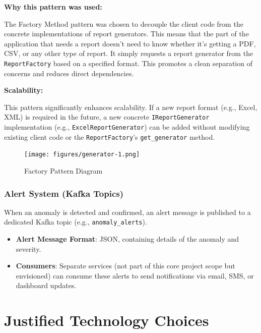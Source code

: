 \textbf{Why this pattern was used:}

The Factory Method pattern was chosen to decouple the client code from the concrete implementations of report generators. This means that the part of the application that needs a report doesn't need to know whether it's getting a PDF, CSV, or any other type of report. It simply requests a report generator from the \texttt{ReportFactory} based on a specified format. This promotes a clean separation of concerns and reduces direct dependencies.

\textbf{Scalability:}

This pattern significantly enhances scalability. If a new report format (e.g., Excel, XML) is required in the future, a new concrete \texttt{IReportGenerator} implementation (e.g., \texttt{ExcelReportGenerator}) can be added without modifying existing client code or the \texttt{ReportFactory}'s \texttt{get\_generator} method.

\begin{figure}[H]
    \centering
    \texttt{[image: figures/generator-1.png]}
    \caption{Factory Pattern Diagram}
    \label{fig:factory_pattern_diagram}
\end{figure}
 




\subsubsection{Alert System (Kafka Topics)}

When an anomaly is detected and confirmed, an alert message is published to a dedicated Kafka topic (e.g., \texttt{anomaly\_alerts}).
\begin{itemize}
    \item \textbf{Alert Message Format}: JSON, containing details of the anomaly and severity.
    \item \textbf{Consumers}: Separate services (not part of this core project scope but envisioned) can consume these alerts to send notifications via email, SMS, or dashboard updates.
\end{itemize}
\section{Justified Technology Choices}

